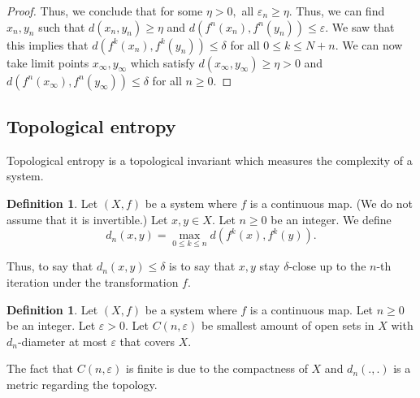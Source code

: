 \documentclass[12pt]{article}
\theoremstyle{definition}
\newtheorem{definition}[theorem]{Definition}
\theoremstyle{remark}
\begin{document}
\begin{proof}
    Thus, we conclude that for some $\eta>0,$ all $\varepsilon_n\geq \eta.$ Thus, we can find $x_n,y_n$ such that $d(x_n,y_n)\geq \eta$ and $d(f^n(x_n),f^n(y_n))\leq \varepsilon.$ We saw that this implies that $d(f^k(x_n),f^k(y_n))\leq \delta$ for all $0\leq k\leq N+n$. We can now take limit points $x_\infty,y_\infty$ which satisfy $d(x_\infty,y_\infty)\geq \eta>0$ and $d(f^n(x_\infty),f^n(y_\infty))\leq \delta$ for all $n\geq 0$. 
\end{proof}

\subsection{Topological entropy}
Topological entropy is a topological invariant which measures the complexity of a system.

\begin{definition}
    Let $(X,f)$ be a system where $f$ is a continuous map. (We do not assume that it is invertible.) Let $x,y\in X$. Let $n\geq 0$ be an integer. We define
    \[
    d_n(x,y)=\max_{0\leq k\leq n} d(f^k(x),f^k(y)).
    \]
\end{definition}
Thus, to say that $d_n(x,y)\leq \delta$ is to say that $x,y$ stay $\delta$-close up to the $n$-th iteration under the transformation $f$.
\begin{definition}
     Let $(X,f)$ be a system where $f$ is a continuous map. Let $n\geq 0$ be an integer. Let $\varepsilon>0.$ Let $C(n,\varepsilon)$ be smallest amount of open sets in $X$ with $d_n$-diameter at most $\varepsilon$ that covers $X$.
\end{definition}
The fact that $C(n,\varepsilon)$ is finite is due to the compactness of $X$ and $d_n(.,.)$ is a metric regarding the topology. 
\end{document}
